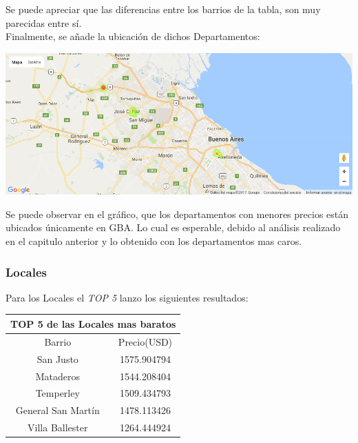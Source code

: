 \documentclass[a4paper, 10pt]{article}
\begin{document}
				Se puede apreciar que las diferencias entre los barrios de la tabla, son muy parecidas entre sí.\\		
				Finalmente, se añade la ubicación de dichos Departamentos:
				
				\begin{center}
   		    				\includegraphics[width=\textwidth]{images/ubicDb}
				\end{center}	
				
				Se puede observar en el gráfico, que los departamentos con menores precios están ubicados únicamente en GBA. Lo cual es esperable, debido al análisis realizado en el capitulo anterior y lo obtenido con los departamentos mas caros.
				
				\subsubsection{Locales}
				
					Para los Locales el \emph{TOP 5} lanzo los siguientes resultados:
				
					\begin{center}
						\begin{tabular}{ |c|c| }
							\hline
							\multicolumn{2}{|c|}{TOP 5 de las Locales mas baratos}\\
							\hline
							\hline
							Barrio & Precio(USD)\\
							\hline
							San Justo & 1575.904794 \\
							Mataderos & 1544.208404 \\
							Temperley & 1509.434793 \\
							General San Martín & 1478.113426 \\
							Villa Ballester 	& 1264.444924 \\
							\hline
						\end{tabular}
					\end{center}
				
\end{document}
